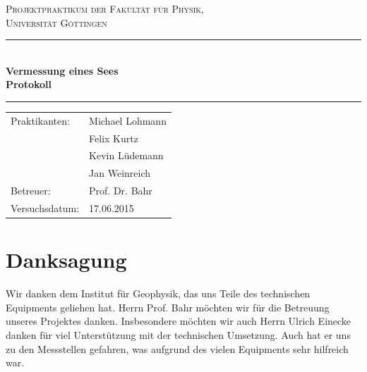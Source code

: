 \documentclass[12pt,a4paper,titlepage,headinclude,bibtotoc]{scrartcl}
\numberwithin{equation}{subsection}
\newenvironment{bottom}{\par\vspace*{\fill}}{\clearpage}
\begin{document}
\begin{titlepage}
\centering
\textsc{\Large Projektpraktikum der Fakultät für
  Physik,\\[1ex] Universität Göttingen}

\vspace*{2cm}

\rule{\textwidth}{1pt}\\[0.5cm]
{\huge \bfseries
  Vermessung eines Sees \\[1ex]
  Protokoll}\\[0.5cm]
\rule{\textwidth}{1pt}

\vspace*{2cm}

\begin{Large}
\begin{tabular}{ll}
Praktikanten: &  Michael Lohmann\\
 &  Felix Kurtz\\
 &  Kevin Lüdemann\\
 &  Jan Weinreich\\
 Betreuer: & Prof. Dr. Bahr\\
 Versuchsdatum: & 17.06.2015\\
\end{tabular}
\end{Large}

\vspace*{3.8cm}

\begin{Large}
\end{Large}

\end{titlepage}

\tableofcontents
\thispagestyle{empty}
\begin{bottom}
\section*{Danksagung}
Wir danken dem Institut für Geophysik, das uns Teile des technischen Equipments geliehen hat.
Herrn Prof. Bahr möchten wir für die Betreuung unseres Projektes danken.
Insbesondere möchten wir auch Herrn Ulrich Einecke danken für viel Unterstützung mit der technischen Umsetzung.
Auch hat er uns zu den Messstellen gefahren, was aufgrund des vielen Equipments sehr hilfreich war.
\end{bottom}
\thispagestyle{empty}
\newpage
\end{document}
